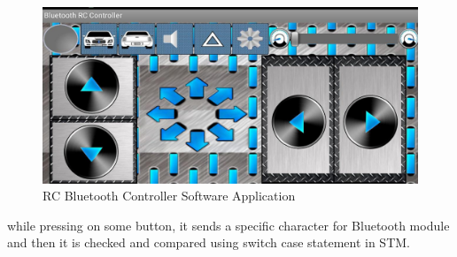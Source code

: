 \begin{figure}[h]
    \centering
    \includegraphics[width=.8\textwidth]{figures/9_15.jpg}
    \caption{RC Bluetooth Controller Software Application}
    \label{fig:rc-bt}
\end{figure}

while pressing on some button, it sends a specific character for Bluetooth module and then it is checked and compared using switch case statement in STM.

